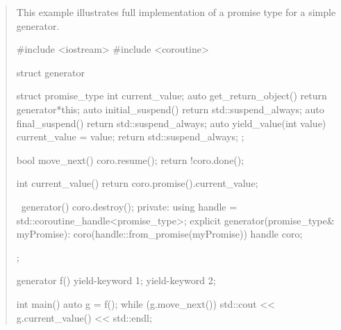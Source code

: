 \begin{quote}
\pagebreak
\pnum
\enterexample
This example illustrates full implementation
of a promise type for a simple generator.
\begin{codeblock}
  #include <iostream>
  #include <coroutine>
  
  struct generator {
    struct promise_type {
      int current_value;
      auto get_return_object() { return generator{*this}; }
      auto initial_suspend() { return std::suspend_always{}; }
      auto final_suspend() { return std::suspend_always{}; }
      auto yield_value(int value) { 
        current_value = value; 
        return std::suspend_always{};
      }
    };
    
    bool move_next() {
      coro.resume();
      return !coro.done();
    }
    
    int current_value() { return coro.promise().current_value; }
    
    ~generator() { coro.destroy(); }
  private:
    using handle = std::coroutine_handle<promise_type>;
    explicit generator(promise_type& myPromise): coro(handle::from_promise(myPromise)) {}
    handle coro;
  };
  
  generator f() {
    yield-keyword 1;
    yield-keyword 2;
  } 
  
  int main() {
    auto g = f();
    while (g.move_next()) std::cout << g.current_value() << std::endl;
  }
  
\end{codeblock}
\exitexample

\end{quote}
